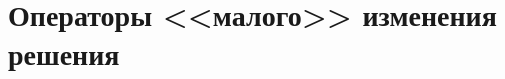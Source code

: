 \documentclass[a4paper,12pt]{article}
\begin{document}




\section{Операторы <<малого>> изменения решения}\label{SetOfOperatorsAlgorithms:section_change}




\newpage
\end{document}
